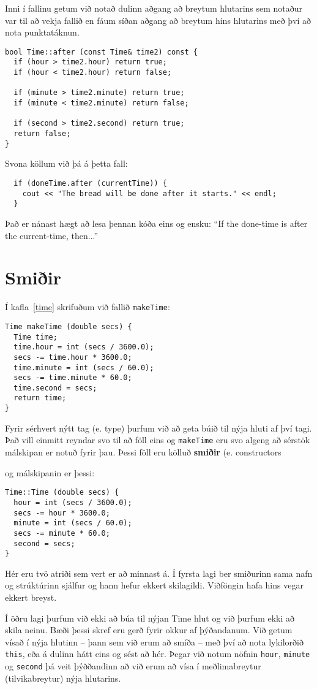 {Inni í fallinu getum við notað dulinn aðgang að breytum hlutarins sem notaður var til að vekja fallið en fáum síðan aðgang að breytum hins hlutarins með því að nota punktatáknun.

\begin{verbatim}
bool Time::after (const Time& time2) const {
  if (hour > time2.hour) return true;
  if (hour < time2.hour) return false;

  if (minute > time2.minute) return true;
  if (minute < time2.minute) return false;

  if (second > time2.second) return true;
  return false;
}
\end{verbatim}
%
Svona köllum við þá á þetta fall:

\begin{verbatim}
  if (doneTime.after (currentTime)) {
    cout << "The bread will be done after it starts." << endl;
  }
\end{verbatim}
%
Það er nánast hægt að lesa þennan kóða eins og ensku:
``If the done-time is after the current-time, then...''

\section{Smiðir}

Í kafla~\ref{time} skrifuðum við fallið {\tt makeTime}:

\begin{verbatim}
Time makeTime (double secs) {
  Time time;
  time.hour = int (secs / 3600.0);
  secs -= time.hour * 3600.0;
  time.minute = int (secs / 60.0);
  secs -= time.minute * 60.0;
  time.second = secs;
  return time;
}
\end{verbatim}
%
Fyrir sérhvert nýtt tag (e. type) þurfum við að geta búið til nýja hluti af því tagi.
Það vill einmitt reyndar svo til að föll eins og {\tt makeTime} eru svo algeng að sérstök málskipan er notuð fyrir þau.
Þessi föll eru kölluð {\bf smiðir} (e. constructors} og málskipanin er þessi: 

\begin{verbatim}
Time::Time (double secs) {
  hour = int (secs / 3600.0);
  secs -= hour * 3600.0;
  minute = int (secs / 60.0);
  secs -= minute * 60.0;
  second = secs;
}
\end{verbatim}
%
Hér eru tvö atriði sem vert er að minnast á.
Í fyrsta lagi ber smiðurinn sama nafn og strúktúrinn sjálfur og hann hefur ekkert skilagildi.
Viðföngin hafa hins vegar ekkert breyst.

Í öðru lagi þurfum við ekki að búa til nýjan Time hlut og við þurfum ekki að skila neinu.
Bæði þessi skref eru gerð fyrir okkur af þýðandanum.
Við getum vísað í nýja hlutinn -- þann sem við erum að smíða -- með því að nota lykilorðið
{\tt this}, eða á dulinn hátt eins og sést að hér. 
Þegar við notum nöfnin {\tt hour}, {\tt minute}
og {\tt second} þá veit þýððandinn að við erum að vísa í meðlimabreytur (tilvikabreytur) nýja hlutarins. 

